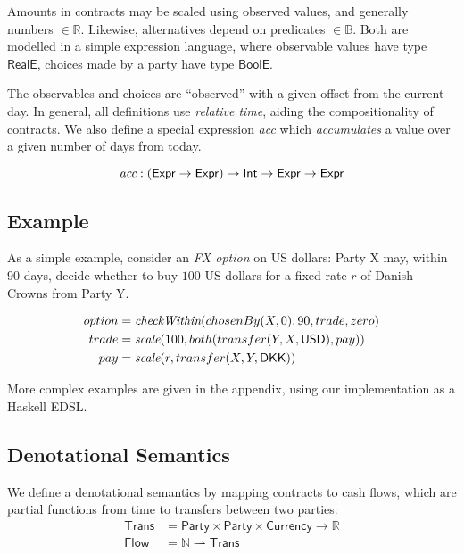 \documentclass[a4paper,debug,twocolumn]{easychair}
\newcommand{\comm}[3][red]{{\small \color{#1}{$\spadesuit$#2: #3}}}
\newcommand{\jbcomment}[1]{\comm[orange]{jb}{#1}}
\newcommand\type[1]{\mathsf{#1}}
\newcommand\reals{{\mathbb R}}
\newcommand\nats{{\mathbb N}}
\newcommand\pto{\rightharpoonup}
\theoremstyle{plain}
\begin{document}
Amounts in contracts may be scaled using observed values, and generally
numbers $\in \mathbb{R}$. Likewise, alternatives depend on predicates
$\in \mathbb{B}$. Both are modelled in a simple expression language,
where 
observable values have type $\type{RealE}$, choices made by a party
have type $\type{BoolE}$.\jbcomment{is that so?}

The observables and choices are ``observed'' with a given offset from the
current day. In general, all definitions use \emph{relative time}, aiding
the compositionality of contracts.
We also define a special expression \emph{acc} which \emph{accumulates} a
value over a given number of days from today.

\vspace*{-2ex}
{\footnotesize
\[
\emph{acc} : (\type{Expr} \to \type{Expr}) \to \type{Int} \to \type{Expr} \to \type{Expr}
\]
}
\vspace*{-3ex}

\subsection{Example}
\label{sec:example}

As a simple example, consider an \emph{FX option} on US dollars:
Party X may, within 90 days, decide whether to buy $100$ US dollars for
a fixed rate $r$ of Danish Crowns from Party Y.

\vspace*{-2ex}
{\footnotesize
\begin{align*}
option &= \emph{checkWithin}(chosenBy(X,0), 90, trade, zero)\\
trade &= \emph{scale}(100, both(transfer(Y, X,\type{USD}), pay))\\
pay &= \emph{scale}(r, transfer(X, Y,\type{DKK}))
\end{align*}

}

More complex examples are given in the appendix, using our implementation as a
Haskell EDSL.

\subsection{Denotational Semantics}
\label{sec:semantics}

We define a denotational semantics by mapping contracts to cash flows,
which are partial functions from time to transfers between two
parties:
\begin{align*}
  \type{Trans} &= \type{Party} \times \type{Party} \times
  \type{Currency} \to \reals\\
  \type{Flow} &= \nats \pto \type{Trans}
\end{align*}
\end{document}
